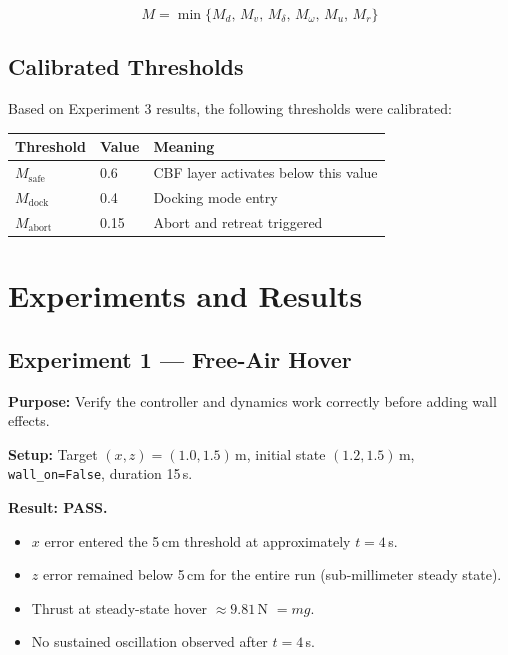 \documentclass[12pt]{article}
\begin{document}
\begin{equation}
    M = \min\{M_d,\, M_v,\, M_\delta,\, M_\omega,\, M_u,\, M_r\}
\end{equation}

\subsection{Calibrated Thresholds}

Based on Experiment 3 results, the following thresholds were calibrated:

\begin{center}
\begin{tabular}{lll}
\toprule
\textbf{Threshold} & \textbf{Value} & \textbf{Meaning} \\
\midrule
$M_\mathrm{safe}$  & 0.6  & CBF layer activates below this value \\
$M_\mathrm{dock}$  & 0.4  & Docking mode entry \\
$M_\mathrm{abort}$ & 0.15 & Abort and retreat triggered \\
\bottomrule
\end{tabular}
\end{center}

\section{Experiments and Results}

\subsection{Experiment 1 --- Free-Air Hover}

\textbf{Purpose:} Verify the controller and dynamics work correctly before
adding wall effects.

\textbf{Setup:} Target $(x, z) = (1.0, 1.5)$\,m, initial state
$(1.2, 1.5)$\,m, \texttt{wall\_on=False}, duration 15\,s.

\textbf{Result: PASS.}
\begin{itemize}
    \item $x$ error entered the 5\,cm threshold at approximately $t = 4$\,s.
    \item $z$ error remained below 5\,cm for the entire run
          (sub-millimeter steady state).
    \item Thrust at steady-state hover $\approx 9.81$\,N $= mg$.
    \item No sustained oscillation observed after $t = 4$\,s.
\end{itemize}
\end{document}

